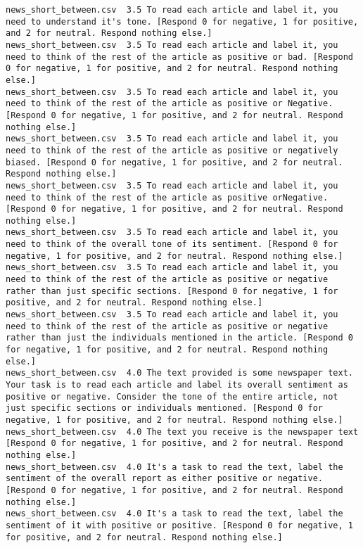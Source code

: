 \begin{lstlisting}[label=lst:promptvariants]
news_short_between.csv	3.5	To read each article and label it, you need to understand it's tone. [Respond 0 for negative, 1 for positive, and 2 for neutral. Respond nothing else.]
news_short_between.csv	3.5	To read each article and label it, you need to think of the rest of the article as positive or bad. [Respond 0 for negative, 1 for positive, and 2 for neutral. Respond nothing else.]
news_short_between.csv	3.5	To read each article and label it, you need to think of the rest of the article as positive or Negative. [Respond 0 for negative, 1 for positive, and 2 for neutral. Respond nothing else.]
news_short_between.csv	3.5	To read each article and label it, you need to think of the rest of the article as positive or negatively biased. [Respond 0 for negative, 1 for positive, and 2 for neutral. Respond nothing else.]
news_short_between.csv	3.5	To read each article and label it, you need to think of the rest of the article as positive orNegative. [Respond 0 for negative, 1 for positive, and 2 for neutral. Respond nothing else.]
news_short_between.csv	3.5	To read each article and label it, you need to think of the overall tone of its sentiment. [Respond 0 for negative, 1 for positive, and 2 for neutral. Respond nothing else.]
news_short_between.csv	3.5	To read each article and label it, you need to think of the rest of the article as positive or negative rather than just specific sections. [Respond 0 for negative, 1 for positive, and 2 for neutral. Respond nothing else.]
news_short_between.csv	3.5	To read each article and label it, you need to think of the rest of the article as positive or negative rather than just the individuals mentioned in the article. [Respond 0 for negative, 1 for positive, and 2 for neutral. Respond nothing else.]
news_short_between.csv	4.0	The text provided is some newspaper text. Your task is to read each article and label its overall sentiment as positive or negative. Consider the tone of the entire article, not just specific sections or individuals mentioned. [Respond 0 for negative, 1 for positive, and 2 for neutral. Respond nothing else.]
news_short_between.csv	4.0	The text you receive is the newspaper text [Respond 0 for negative, 1 for positive, and 2 for neutral. Respond nothing else.]
news_short_between.csv	4.0	It's a task to read the text, label the sentiment of the overall report as either positive or negative. [Respond 0 for negative, 1 for positive, and 2 for neutral. Respond nothing else.]
news_short_between.csv	4.0	It's a task to read the text, label the sentiment of it with positive or positive. [Respond 0 for negative, 1 for positive, and 2 for neutral. Respond nothing else.]

\end{lstlisting}
